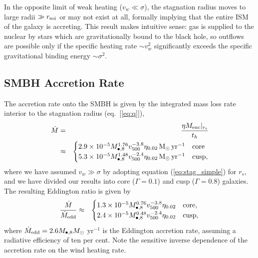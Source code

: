 \documentclass[usenatbib,fleqn]{mn2e}
\newcommand{\Menc}{M_{\rm enc}}
\newcommand{\Mbheight}{M_{\bullet,8}}
\newcommand{\pyear}{{\rm yr}^{-1}}
\renewcommand{\th}{t_h}
\begin{document}
In the opposite limit of weak heating ($v_{w} \ll \sigma$), the stagnation radius moves to large radii $\gg r_{\rm soi}$ or may not exist at all, formally implying that the entire ISM of the galaxy is accreting.  This result makes intuitive sense: gas is supplied to the nuclear by stars which are gravitationally bound to the black hole, so outflows are possible only if the specific heating rate $\sim v_{w}^{2}$ significantly exceeds the specific gravitational binding energy $\sim \sigma^{2}$.


\subsection{SMBH Accretion Rate}

The accretion rate onto the SMBH is given by the integrated mass loss rate interior to the stagnation radius (eq.~[\ref{eq:q}]), 
\begin{eqnarray}
  \dot{M} &=& \frac{\eta \Menc|_{r_{\rm s}}}{\th} \nonumber \\
&\approx&
  \begin{cases}
    2.9 \times 10^{-5} M_{\bullet,8}^{1.76}
    v_{500}^{-3.8}  \eta_{0.02} \Msun \, \pyear& \text{core} \\
    5.3 \times 10^{-5} M_{\bullet,8}^{1.48} 
    v_{500}^{-2.4}  \eta_{0.02} \Msun \, \pyear  & \text{cusp}, 
  \end{cases}
  \label{eq:mdot_analytic}
\end{eqnarray}
where we have assumed $v_{w} \gg \sigma$ by adopting equation (\ref{eq:stag_simple}) for $r_s$, and we have divided our results into core ($\Gamma = 0.1$) and cusp ($\Gamma = 0.8$) galaxies.  The resulting Eddington ratio is given by 
\begin{eqnarray}
\frac{\dot{M}}{\dot{M}_{\rm edd}} &\approx&
  \begin{cases}
    1.3 \times 10^{-5} M_{\bullet,8}^{0.76}
    v_{500}^{-3.8}  \eta_{0.02}   & \text{core}, \\
    2.4 \times 10^{-5} \Mbheight^{0.48} 
    v_{500}^{-2.4}  \eta_{0.02}   & \text{cusp}, 
  \end{cases}
  \label{eq:eddr_analytic}
\end{eqnarray}
where $\dot{M}_{\rm edd} = 2.6M_{\bullet,8}M_{\odot}$ yr$^{-1}$  is the Eddington accretion rate, assuming a radiative efficiency of ten per cent.  Note the sensitive inverse dependence of the accretion rate on the wind heating rate.  
\end{document}
